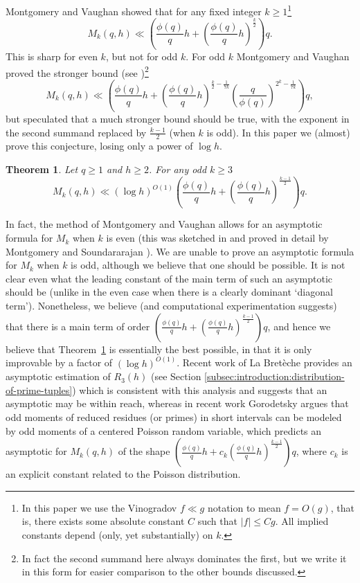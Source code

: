 \documentclass[11pt,letterpaper]{amsart}
\newcommand{\brac}[1]{\left( #1\right)}
\newtheorem{theorem}{Theorem}
\theoremstyle{definition}
\begin{document}
Montgomery and Vaughan \cite{MV86} showed that for any fixed integer $k\geq 1$\footnote{In this paper we use the Vinogradov $f\ll g$ notation to mean $f=O(g)$, that is, there exists some absolute constant $C$ such that $\lvert f\rvert \leq Cg$. All implied constants depend (only, yet substantially) on $k$.}
\[M_k(q,h)\ll \brac{\frac{\phi(q)}{q}h+\brac{\frac{\phi(q)}{q}h}^{\frac{k}{2}}}q.\]
This is sharp for even $k$, but not for odd $k$. For odd $k$ Montgomery and Vaughan proved the stronger bound (see \cite[equation (18)]{MV86})\footnote{In fact the second summand here always dominates the first, but we write it in this form for easier comparison to the other bounds discussed.}
\[M_k(q,h)\ll \brac{\frac{\phi(q)}{q}h+\brac{\frac{\phi(q)}{q}h}^{\frac{k}{2}-\frac{1}{7k}}\brac{\frac{q}{\phi(q)}}^{2^k-\frac{1}{7k}}}q ,\]
but speculated that a much stronger bound should be true, with the exponent in the second summand replaced by $\frac{k-1}{2}$ (when $k$ is odd). In this paper we (almost) prove this conjecture, losing only a power of $\log h$.
\begin{theorem}\label{thm:montgomery-vaughan-odd}
Let $q \ge 1$ and $h\ge 2$. For any odd $k\geq 3$
\[M_k(q,h)\ll (\log h)^{O(1)}\brac{\frac{\phi(q)}{q}h+\brac{\frac{\phi(q)}{q}h}^{\frac{k-1}{2}}}q.\]
\end{theorem}

In fact, the method of Montgomery and Vaughan allows for an asymptotic formula for $M_k$ when $k$ is even (this was sketched in \cite{MV86} and proved in detail by Montgomery and Soundararajan \cite{MS04}). We are unable to prove an asymptotic formula for $M_k$ when $k$ is odd, although we believe that one should be possible. It is not clear even what the leading constant of the main term of such an asymptotic should be (unlike in the even case when there is a clearly dominant `diagonal term'). Nonetheless, we believe (and computational experimentation suggests) that there is a main term of order $(\frac{\phi(q)}{q}h+(\tfrac{\phi(q)}{q}h)^{\frac{k-1}{2}})q$, and hence we believe that Theorem~\ref{thm:montgomery-vaughan-odd} is essentially the best possible, in that it is only improvable by a factor of $(\log h)^{O(1)}$. Recent work of La Bret\`eche \cite{dlB-3rd-moment} provides an asymptotic estimation of $R_3(h)$ (see Section \ref{subsec:introduction:distribution-of-prime-tuples}) which is consistent with this analysis and suggests that an asymptotic may be within reach, whereas in recent work Gorodetsky \cite[Conjecture 1]{Gor} argues that odd moments of reduced residues (or primes) in short intervals can be modeled by odd moments of a centered Poisson random variable, which predicts an asymptotic for $M_k(q,h)$ of the shape $(\tfrac{\phi(q)}{q}h+c_k(\tfrac{\phi(q)}{q}h)^{\frac{k-1}{2}})q$, where $c_k$ is an explicit constant related to the Poisson distribution. 
\end{document}
